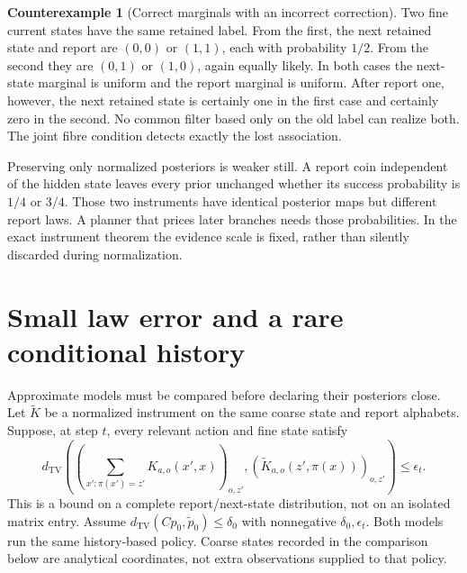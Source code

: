 \documentclass[11pt,oneside,openany]{book}
\theoremstyle{definition}\newtheorem{definition}[theorem]{Definition}
\newtheorem{counterexample}[theorem]{Counterexample}
\newcommand{\TV}{d_{\mathrm{TV}}}
\begin{document}
\begin{counterexample}[Correct marginals with an incorrect correction]\label{ce:joint-marginals}
Two fine current states have the same retained label. From the first, the next retained state and report are $(0,0)$ or $(1,1)$, each with probability $1/2$. From the second they are $(0,1)$ or $(1,0)$, again equally likely. In both cases the next-state marginal is uniform and the report marginal is uniform. After report one, however, the next retained state is certainly one in the first case and certainly zero in the second. No common filter based only on the old label can realize both. The joint fibre condition detects exactly the lost association.
\end{counterexample}

Preserving only normalized posteriors is weaker still. A report coin independent of the hidden state leaves every prior unchanged whether its success probability is $1/4$ or $3/4$. Those two instruments have identical posterior maps but different report laws. A planner that prices later branches needs those probabilities. In the exact instrument theorem the evidence scale is fixed, rather than silently discarded during normalization.

\section{Small law error and a rare conditional history}
Approximate models must be compared before declaring their posteriors close. Let $\widetilde K$ be a normalized instrument on the same coarse state and report alphabets. Suppose, at step $t$, every relevant action and fine state satisfy
\[
 \TV\left(\left(\sum_{x':\pi(x')=z'}K_{a,o}(x',x)\right)_{o,z'},
             (\widetilde K_{a,o}(z',\pi(x)))_{o,z'}\right)\le\epsilon_t.
\]
This is a bound on a complete report/next-state distribution, not on an isolated matrix entry. Assume $\TV(Cp_0,\widetilde p_0)\le\delta_0$ with nonnegative $\delta_0,\epsilon_t$. Both models run the same history-based policy. Coarse states recorded in the comparison below are analytical coordinates, not extra observations supplied to that policy.
\end{document}
